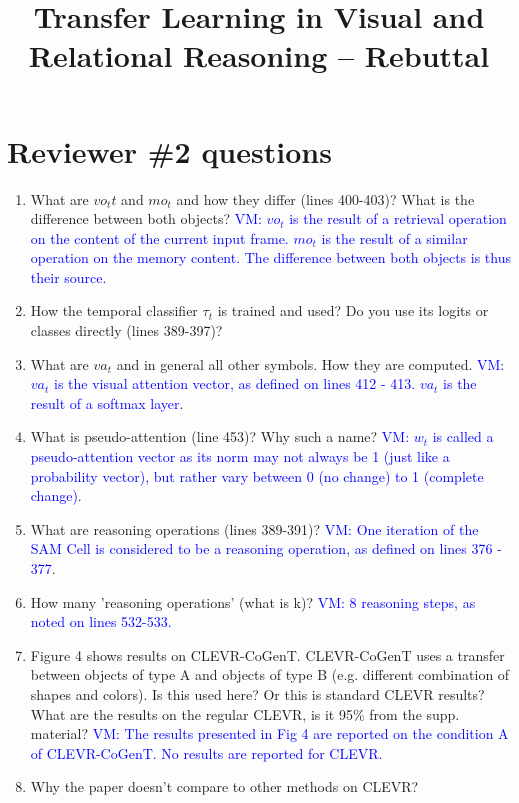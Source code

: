 \documentclass[10pt,twocolumn,letterpaper]{article}
\newcommand{\vm}[1]{\textcolor{blue}{VM: #1}}
\begin{document}
\title{Transfer Learning in Visual and Relational Reasoning -- Rebuttal}
\maketitle
\thispagestyle{empty}

\section{Reviewer \#2 questions}

\begin{enumerate}
  \item What are $vo_tt$ and $mo_t$ and how they differ (lines 400-403)? What is the difference between both objects? \vm{$vo_t$ is the result of a retrieval operation on the content of the current input frame. $mo_t$ is the result of a similar operation on the memory content. The difference between both objects is thus their source.}

  \item How the temporal classifier $\tau_t$ is trained and used? Do you use its logits or classes directly (lines 389-397)?
  \item What are $va_t$ and in general all other symbols. How they are computed. \vm{$va_t$ is the visual attention vector, as defined on lines 412 - 413. $va_t$ is the result of a softmax layer}.
  \item What is pseudo-attention (line 453)? Why such a name? \vm{$w_t$ is called a pseudo-attention vector as its norm may not always be 1 (just like a probability vector), but rather vary between 0 (no change) to 1 (complete change)}.
  \item What are reasoning operations (lines 389-391)? \vm{One iteration of the SAM Cell is considered to be a reasoning operation, as defined on lines 376 - 377}.
  \item How many 'reasoning operations' (what is k)? \vm{8 reasoning steps, as noted on lines 532-533.}
  \item Figure 4 shows results on CLEVR-CoGenT. CLEVR-CoGenT uses a transfer between objects of type A and objects of type B (e.g. different combination of shapes and colors). Is this used here? Or this is standard CLEVR results? What are the results on the regular CLEVR, is it 95\% from the supp. material? \vm{The results presented in Fig 4 are reported on the condition A of CLEVR-CoGenT. No results are reported for CLEVR.}
  \item Why the paper doesn't compare to other methods on CLEVR?
\end{enumerate}



% 
% 
\end{document}
